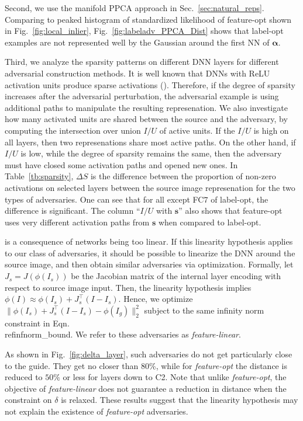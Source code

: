 \documentclass{article} %
\newcommand{\source}{{\boldsymbol{\mathbf{s}}}}\newcommand{\guide}{\boldsymbol{\mathbf{g}}}\newcommand{\adv}{\boldsymbol{\mathbf{\alpha}}}\newcommand{\neigh}[2]{\ensuremath{n_{#1} ({#2})}}\newcommand{\Neighs}[2]{\ensuremath{\mathcal{N}}_{{#1}} ({#2})}\newcommand{\NNavg}[2]{\ensuremath{a_{#1} ({#2})}}\newcommand{\NNz}[2]{\ensuremath{z_{#1} ({#2})}}\newcommand{\class}[1]{C ({#1})}\newcommand{\dist}[2]{\ensuremath{D ({#1}, {#2})}}\newcommand{\rank}[2]{\ensuremath{r_{#1} ({#2})}}\newcommand{\rankdiff}[1]{\ensuremath{\Delta{r_{#1}}}}\newcommand{\dlike}[2]{\ensuremath{\Delta L({#1}, {#2})}}%
\newcommand{\T}{\ensuremath{\top}}
\begin{document}
Second, we use the manifold PPCA approach in Sec.~\ref{sec:natural_reps}.
Comparing to peaked histogram of standardized likelihood of feature-opt
shown in Fig.~\ref{fig:local_inlier}, Fig.~\ref{fig:labeladv_PPCA_Dist}
shows that label-opt examples are not represented well by the Gaussian
around the first NN of $\adv$.


Third, we analyze the sparsity  patterns on different DNN layers for
different adversarial construction methods. It is well known that DNNs
with ReLU activation units produce sparse activations
(\cite{AISTATS2011_GlorotBB11}).  Therefore, if the degree of sparsity
increases after the adversarial perturbation, the adversarial example
is using additional paths to manipulate the resulting represenation.
We also investigate how many activated units are shared between the source
and the adversary, by computing the intersection over union {\em $I/U$} of
active units. If the $I/U$ is high on all layers, then two represenations
share most active paths. On the other hand, if $I/U$ is low,
while the degree of sparsity remains the same, then the adversary must have
closed some activation paths and opened new ones. In Table~\ref{tb:sparsity},
$\Delta S$ is the difference between the proportion of non-zero activations on
selected layers between the source image represenation for the two types
of adversaries. One can see that for all except FC$7$ of label-opt, the
difference is significant. The column ``$I/U$ with $\source$'' also shows that
feature-opt uses very different activation paths from $\source$ when compared
to label-opt.

is a consequence of networks being too linear.  If this linearity hypothesis
applies to our class of adversaries, it should be possible to linearize the
DNN around the source image, and then obtain similar adversaries via
optimization. Formally, let $J_s = J(\phi(I_s))$ be the Jacobian matrix
of the internal layer encoding with respect to source image input.
Then, the
linearity hypothesis implies $\phi(I) \approx \phi(I_s) + J_s^{\T}(I-I_s)$.
Hence, we optimize $\| \phi(I_s) + J_s^{\T}(I-I_s) - \phi(I_g)\|^2_2$
subject to the same infinity norm constraint in Eqn.\\ref{infnorm_bound}.
We refer to these adversaries as {\em feature-linear}.

As shown in Fig.~\ref{fig:delta_layer}, such adversaries do not get
particularly close to the guide.  They get no closer than 80\%, while
for {\em feature-opt} the distance is reduced to $50\%$ or less
for layers down to C2.  Note that unlike {\em feature-opt}, the objective
of {\em feature-linear} does not guarantee a reduction in distance
when the constraint on $\delta$ is relaxed.  These results suggest that
the linearity hypothesis may not explain the existence of {\em feature-opt}
adversaries.
\end{document}
